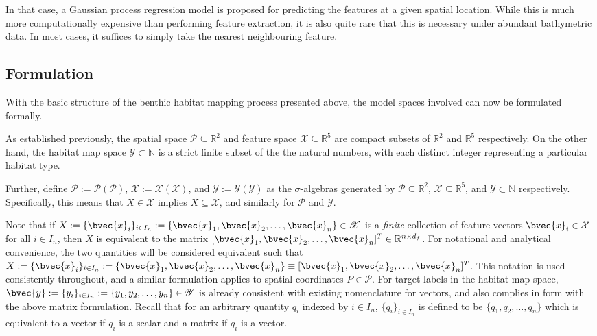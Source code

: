 		In that case, a Gaussian process regression model is proposed for predicting the features at a given spatial location. While this is much more computationally expensive than performing feature extraction, it is also quite rare that this is necessary under abundant bathymetric data. In most cases, it suffices to simply take the nearest neighbouring feature.		
		
		\subsection{Formulation}
		
			With the basic structure of the benthic habitat mapping process presented above, the model spaces involved can now be formulated formally.
			
			As established previously, the spatial space $\mathcal{P} \subseteq \mathbb{R}^{2}$ and feature space $\mathcal{X} \subseteq \mathbb{R}^{5}$ are compact subsets of $\mathbb{R}^{2}$ and $\mathbb{R}^{5}$ respectively. On the other hand, the habitat map space $\mathcal{Y} \subset \mathbb{N}$ is a strict finite subset of the the natural numbers, with each distinct integer representing a particular habitat type.
			
			Further, define $\mathscr{P} := \mathscr{P}(\mathcal{P})$, $\mathscr{X} := \mathscr{X}(\mathcal{X})$, and $\mathscr{Y} := \mathscr{Y}(\mathcal{Y})$ as the $\sigma$-algebras generated by $\mathcal{P} \subseteq \mathbb{R}^{2}$, $\mathcal{X} \subseteq \mathbb{R}^{5}$, and $\mathcal{Y} \subset \mathbb{N}$ respectively. Specifically, this means that $X \in \mathscr{X}$ implies $X \subseteq \mathcal{X}$, and similarly for $\mathscr{P}$ and $\mathscr{Y}$.
			
			Note that if $X := \{\bvec{x}_{i}\}_{i \in I_{n}} := \{\bvec{x}_{1}, \bvec{x}_{2}, \dots, \bvec{x}_{n}\} \in \mathscr{X}$ is a \textit{finite} collection of feature vectors $\bvec{x}_{i} \in \mathcal{X}$ for all $i \in I_{n}$, then $X$ is equivalent to the matrix $[\bvec{x}_{1}, \bvec{x}_{2}, \dots, \bvec{x}_{n}]^{T} \in \mathbb{R}^{n \times d_{f}}$. For notational and analytical convenience, the two quantities will be considered equivalent such that $X := \{\bvec{x}_{i}\}_{i \in I_{n}} := \{\bvec{x}_{1}, \bvec{x}_{2}, \dots, \bvec{x}_{n}\} \equiv [\bvec{x}_{1}, \bvec{x}_{2}, \dots, \bvec{x}_{n}]^{T}$. This notation is used consistently throughout, and a similar formulation applies to spatial coordinates $P \in \mathscr{P}$. For target labels in the habitat map space, $\bvec{y} := \{y_{i}\}_{i \in I_{n}} := \{y_{1}, y_{2}, \dots, y_{n}\} \in \mathscr{Y}$ is already consistent with existing nomenclature for vectors, and also complies in form with the above matrix formulation. Recall that for an arbitrary quantity $q_{i}$ indexed by $i \in I_{n}$, $\{q_{i}\}_{i \in I_{n}}$ is defined to be $\{q_{1}, q_{2}, \dots, q_{n}\}$ which is equivalent to a vector if $q_{i}$ is a scalar and a matrix if $q_{i}$ is a vector.
		
